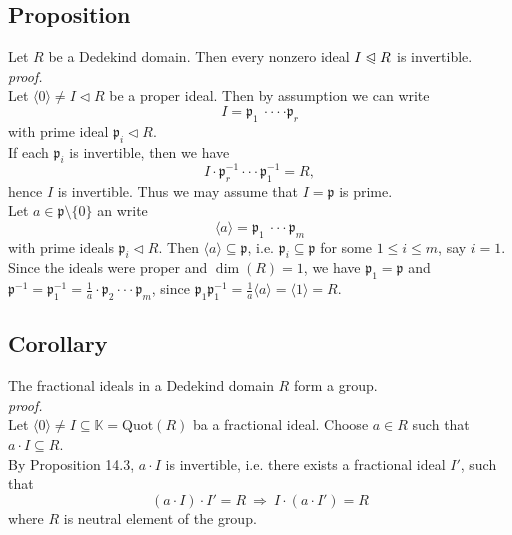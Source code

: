 \documentclass[12pt]{book}
\begin{document}
\begin{spacing}{1.3}
\subsection{Proposition} %
Let $R$ be a Dedekind domain. Then every nonzero ideal $I \trianglelefteqslant R$ is invertible.\\
\textit{proof.}\\
Let $\langle 0 \rangle \neq I \triangleleft R$ be a proper ideal. Then by assumption we can write
$$I= \mathfrak{p}_1 \ \cdot \cdot \cdot \cdot \mathfrak{p}_r$$
with prime ideal $\mathfrak{p}_i \triangleleft R$. \\
If each $\mathfrak{p}_i$ is invertible, then we have
$$I \cdot \mathfrak{p}_r^{-1} \cdot \cdot \cdot \mathfrak{p}_1^{-1}=R,$$hence $I$ is invertible. Thus we may assume that $I= \mathfrak{p}$ is prime.\\
Let $a \in \mathfrak{p} \setminus \{0\}$ an write
$$\langle a \rangle = \mathfrak{p}_1 \ \cdot \cdot \cdot \mathfrak{p}_m$$
with prime ideals $\mathfrak{p}_i \triangleleft R$. Then $\langle a \rangle \subseteq \mathfrak{p}$, i.e. $\mathfrak{p}_i \subseteq \mathfrak{p}$ for some $1 \leqslant i \leqslant m$, say $i=1$.
Since the ideals were proper and $\dim(R)=1$, we have $\mathfrak{p}_1=\mathfrak{p}$ and $\mathfrak{p}^{-1}=\mathfrak{p}_1^{-1}=\frac{1}{a} \cdot \mathfrak{p}_2 \cdot \cdot \cdot \mathfrak{p}_m$, since $\mathfrak{p}_1 \mathfrak{p}_{1}^{-1}=\frac{1}{a} \langle a \rangle = \langle 1 \rangle = R$.

\subsection{Corollary} %
The fractional ideals in a Dedekind domain $R$ form a group.\\
\textit{proof.}\\
Let $\langle 0 \rangle \neq I \subseteq \mathbb{K}=\textrm{Quot}(R)$ ba a fractional ideal. Choose $a \in R$ such that $a \cdot I \subseteq R$. \\
By Proposition 14.3, $a \cdot I$ is invertible, i.e. there exists a fractional ideal $I'$, such that 
$$(a \cdot I) \cdot I' = R \ \Longrightarrow \ I \cdot (a \cdot I') =R$$
where $R$ is neutral element of the group.


\end{spacing}
\end{document}
